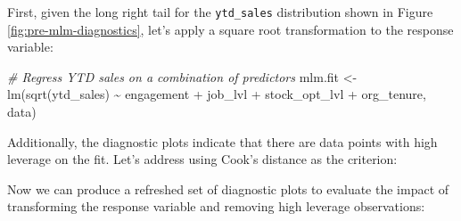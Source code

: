 \documentclass[
]{book}
\newenvironment{Shaded}{\begin{snugshade}}{\end{snugshade}}
\newcommand{\AttributeTok}[1]{\textcolor[rgb]{0.77,0.63,0.00}{#1}}
\newcommand{\CommentTok}[1]{\textcolor[rgb]{0.56,0.35,0.01}{\textit{#1}}}
\newcommand{\DecValTok}[1]{\textcolor[rgb]{0.00,0.00,0.81}{#1}}
\newcommand{\FunctionTok}[1]{\textcolor[rgb]{0.00,0.00,0.00}{#1}}
\newcommand{\NormalTok}[1]{#1}
\newcommand{\OtherTok}[1]{\textcolor[rgb]{0.56,0.35,0.01}{#1}}
\newcommand{\SpecialCharTok}[1]{\textcolor[rgb]{0.00,0.00,0.00}{#1}}
\begin{document}
First, given the long right tail for the \texttt{ytd\_sales} distribution shown in Figure \ref{fig:pre-mlm-diagnostics}, let's apply a square root transformation to the response variable:

\begin{Shaded}
\begin{Highlighting}[]
\CommentTok{\# Regress YTD sales on a combination of predictors}
\NormalTok{mlm.fit }\OtherTok{\textless{}{-}} \FunctionTok{lm}\NormalTok{(}\FunctionTok{sqrt}\NormalTok{(ytd\_sales) }\SpecialCharTok{\textasciitilde{}}\NormalTok{ engagement }\SpecialCharTok{+}\NormalTok{ job\_lvl }\SpecialCharTok{+}\NormalTok{ stock\_opt\_lvl }\SpecialCharTok{+}\NormalTok{ org\_tenure, data)}
\end{Highlighting}
\end{Shaded}

Additionally, the diagnostic plots indicate that there are data points with high leverage on the fit. Let's address using Cook's distance as the criterion:

\begin{Shaded}
\end{Shaded}

Now we can produce a refreshed set of diagnostic plots to evaluate the impact of transforming the response variable and removing high leverage observations:
\end{document}
